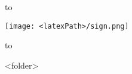 \bigbreak
\bigbreak
\bigbreak
\bigbreak

\hbox to 
\begin{flushright}
\texttt{[image: <latexPath>/sign.png]}
\end{flushright}

\hbox to 

\bigbreak
\bigbreak

<folder>
